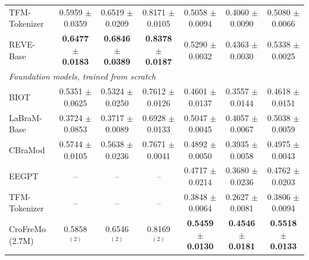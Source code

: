 \begin{table}[t]
{\begin{tabular}{lcccccc}
TFM-Tokenizer & 0.5959 $\pm$ 0.0359 & 0.6519 $\pm$ 0.0209 & 0.8171 $\pm$ 0.0105 & 0.5058 $\pm$ 0.0094 & 0.4060 $\pm$ 0.0090 & 0.5080 $\pm$ 0.0066 \\
REVE-Base & \textbf{0.6477 $\pm$ 0.0183} & \textbf{0.6846 $\pm$ 0.0389} & \textbf{0.8378 $\pm$ 0.0187} & 0.5290 $\pm$ 0.0032 & 0.4363 $\pm$ 0.0030 & 0.5338 $\pm$ 0.0025 \\
\midrule
\multicolumn{7}{l}{\textit{Foundation models, trained from scratch}} \\
BIOT & 0.5351 $\pm$ 0.0625 & 0.5324 $\pm$ 0.0250 & 0.7612 $\pm$ 0.0126 & 0.4601 $\pm$ 0.0137 & 0.3557 $\pm$ 0.0144 & 0.4618 $\pm$ 0.0151 \\
LaBraM-Base & 0.3724 $\pm$ 0.0853 & 0.3717 $\pm$ 0.0089 & 0.6928 $\pm$ 0.0133 & 0.5047 $\pm$ 0.0045 & 0.4057 $\pm$ 0.0067 & 0.5038 $\pm$ 0.0059 \\
CBraMod & 0.5744 $\pm$ 0.0105 & 0.5638 $\pm$ 0.0236 & 0.7671 $\pm$ 0.0041 & 0.4892 $\pm$ 0.0050 & 0.3935 $\pm$ 0.0058 & 0.4975 $\pm$ 0.0043 \\
EEGPT & -- & -- & -- & 0.4717 $\pm$ 0.0214 & 0.3680 $\pm$ 0.0236 & 0.4762 $\pm$ 0.0203 \\
TFM-Tokenizer & -- & -- & -- & 0.3848 $\pm$ 0.0064 & 0.2627 $\pm$ 0.0081 & 0.3806 $\pm$ 0.0094 \\
\midrule
CroFreMo (2.7M) & 0.5858$^{(2)}$ & 0.6546$^{(2)}$ & 0.8169$^{(2)}$ & \textbf{0.5459 $\pm$ 0.0130} & \textbf{0.4546 $\pm$ 0.0181} & \textbf{0.5518 $\pm$ 0.0133} \\
\bottomrule
\end{tabular}}
\end{table}